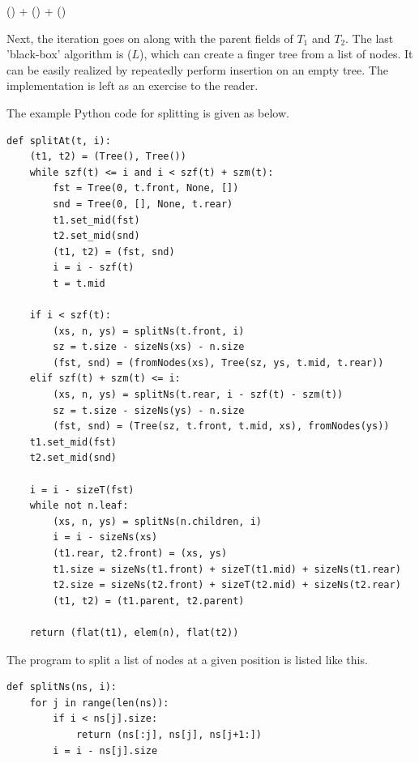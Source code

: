 \documentclass[b5paper]{article}
\begin{document}
\begin{algorithmic}
  \State \Return {}() + () + ()
\EndFunction
\end{algorithmic}

Next, the iteration goes on along with the parent fields of $T_1$ and $T_2$. The last 'black-box'
algorithm is ($L$), which can create a finger tree from a list of nodes.
It can be easily realized by repeatedly perform insertion on an empty tree. The implementation
is left as an exercise to the reader.

The example Python code for splitting is given as below.

\lstset{language=Python}
\begin{lstlisting}
def splitAt(t, i):
    (t1, t2) = (Tree(), Tree())
    while szf(t) <= i and i < szf(t) + szm(t):
        fst = Tree(0, t.front, None, [])
        snd = Tree(0, [], None, t.rear)
        t1.set_mid(fst)
        t2.set_mid(snd)
        (t1, t2) = (fst, snd)
        i = i - szf(t)
        t = t.mid

    if i < szf(t):
        (xs, n, ys) = splitNs(t.front, i)
        sz = t.size - sizeNs(xs) - n.size
        (fst, snd) = (fromNodes(xs), Tree(sz, ys, t.mid, t.rear))
    elif szf(t) + szm(t) <= i:
        (xs, n, ys) = splitNs(t.rear, i - szf(t) - szm(t))
        sz = t.size - sizeNs(ys) - n.size
        (fst, snd) = (Tree(sz, t.front, t.mid, xs), fromNodes(ys))
    t1.set_mid(fst)
    t2.set_mid(snd)

    i = i - sizeT(fst)
    while not n.leaf:
        (xs, n, ys) = splitNs(n.children, i)
        i = i - sizeNs(xs)
        (t1.rear, t2.front) = (xs, ys)
        t1.size = sizeNs(t1.front) + sizeT(t1.mid) + sizeNs(t1.rear)
        t2.size = sizeNs(t2.front) + sizeT(t2.mid) + sizeNs(t2.rear)
        (t1, t2) = (t1.parent, t2.parent)

    return (flat(t1), elem(n), flat(t2))
\end{lstlisting}

The program to split a list of nodes at a given position is listed like this.

\begin{lstlisting}
def splitNs(ns, i):
    for j in range(len(ns)):
        if i < ns[j].size:
            return (ns[:j], ns[j], ns[j+1:])
        i = i - ns[j].size
\end{lstlisting}
\end{document}
